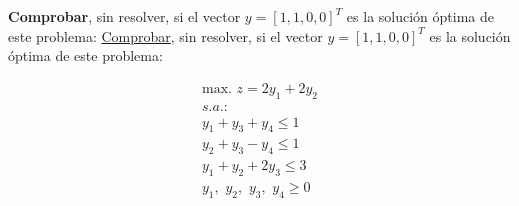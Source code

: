 \textbf{Comprobar}, sin resolver, si el vector $y=[1,1,0,0]^T$ es la solución óptima de este problema:
\underline{Comprobar}, sin resolver, si el vector $y=[1,1,0,0]^T$ es la solución óptima de este problema:

\begin{equation}
\begin{split}
\mbox{max. } z = 2y_1 + 2y_2\\
s.a.:\\
y_1 + y_3 + y_4 \leq  1\\
y_2+y_3-y_4\leq 1\\
y_1+y_2+2y_3 \leq 3 \\
y_1,\,\,y_2,\,\,y_3,\,\,y_4\geq 0\\
\end{split}
\end{equation}
